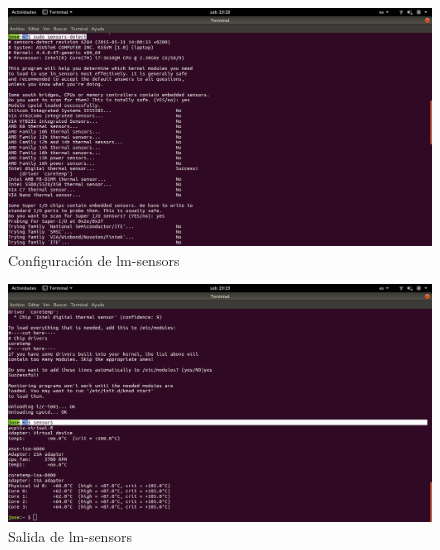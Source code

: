 \begin{figure}[H] %
\centering
\includegraphics[scale=0.3]{./imagenes/P3_E2_2.png}  %
\caption{Configuración de lm-sensors} \label{fig:P3_E2_2}
\end{figure}

\begin{figure}[H] %
\centering
\includegraphics[scale=0.3]{./imagenes/P3_E2_3.png}  %
\caption{Salida de lm-sensors} \label{fig:P3_E2_3}
\end{figure}









